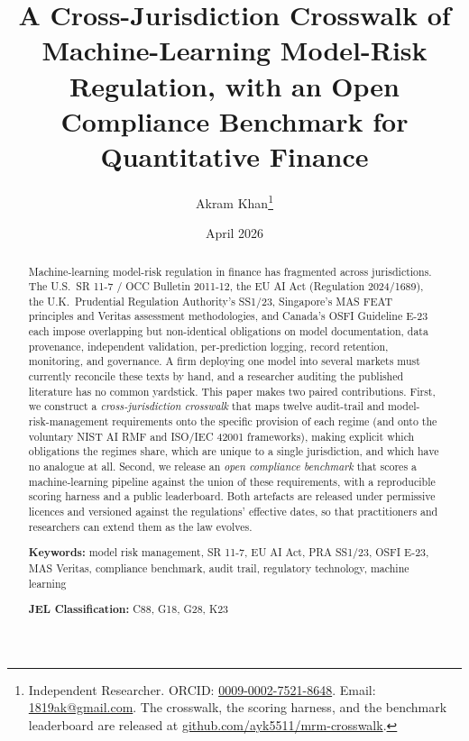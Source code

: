 \documentclass[12pt,a4paper]{article}
\title{A Cross-Jurisdiction Crosswalk of Machine-Learning Model-Risk Regulation, with an Open Compliance Benchmark for Quantitative Finance}
\author{
    Akram Khan\thanks{Independent Researcher. ORCID: \href{https://orcid.org/0009-0002-7521-8648}{0009-0002-7521-8648}. Email: \href{mailto:1819ak@gmail.com}{1819ak@gmail.com}. The crosswalk, the scoring harness, and the benchmark leaderboard are released at \href{https://github.com/ayk5511/mrm-crosswalk}{github.com/ayk5511/mrm-crosswalk}.}
}
\date{April 2026}
\begin{document}
\maketitle

\begin{abstract}
Machine-learning model-risk regulation in finance has fragmented across jurisdictions. The U.S.\ SR 11-7 / OCC Bulletin 2011-12, the EU AI Act (Regulation 2024/1689), the U.K.\ Prudential Regulation Authority's SS1/23, Singapore's MAS FEAT principles and Veritas assessment methodologies, and Canada's OSFI Guideline E-23 each impose overlapping but non-identical obligations on model documentation, data provenance, independent validation, per-prediction logging, record retention, monitoring, and governance. A firm deploying one model into several markets must currently reconcile these texts by hand, and a researcher auditing the published literature has no common yardstick. This paper makes two paired contributions. First, we construct a \emph{cross-jurisdiction crosswalk} that maps twelve audit-trail and model-risk-management requirements onto the specific provision of each regime (and onto the voluntary NIST AI RMF and ISO/IEC 42001 frameworks), making explicit which obligations the regimes share, which are unique to a single jurisdiction, and which have no analogue at all. Second, we release an \emph{open compliance benchmark} that scores a machine-learning pipeline against the union of these requirements, with a reproducible scoring harness and a public leaderboard. Both artefacts are released under permissive licences and versioned against the regulations' effective dates, so that practitioners and researchers can extend them as the law evolves.

\medskip
\noindent\textbf{Keywords:} model risk management, SR 11-7, EU AI Act, PRA SS1/23, OSFI E-23, MAS Veritas, compliance benchmark, audit trail, regulatory technology, machine learning

\medskip
\noindent\textbf{JEL Classification:} C88, G18, G28, K23
\end{abstract}

\newpage
\tableofcontents
\newpage








\end{document}

